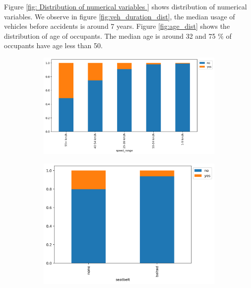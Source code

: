 \documentclass[12pt,a4paper]{article}
\begin{document}
Figure  \ref{fig: Distribution of numerical variables } shows distribution of numerical variables. We observe in figure \ref{fig:veh_duration_dist}, the median usage of vehicles before accidents is around 7 years. Figure \ref{fig:age_dist} shows the distribution of age of occupants. The median age is around 32 and 75 \% of occupants have age less than 50.  
	
	\begin{figure}[h]
	\centering
	\begin{subfigure}[t]{0.32\textwidth}
		\centering
		\includegraphics[width=\textwidth]{speed_range_stack_deceased.png}
		\caption{}
		\label{fig:speed_range_stack_deceased}
	\end{subfigure}
	\hfill
	\begin{subfigure}[t]{0.32\textwidth}
		\centering
		\includegraphics[width=\textwidth]{seat_belt_stack_deceased.png}
		\caption{}
		\label{fig:seat_belt_stack_deceased}
	\end{subfigure}

\end{figure}
\end{document}
